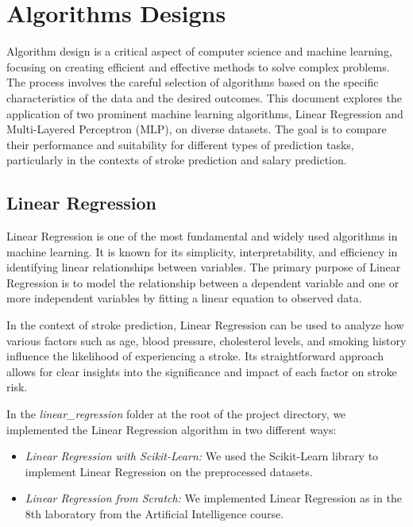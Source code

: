 \documentclass[runningheads]{paper}
\begin{document}
\section{Algorithms Designs}
Algorithm design is a critical aspect of computer science and machine learning, 
focusing on creating efficient and effective methods to solve complex problems. 
The process involves the careful selection of algorithms based on the specific 
characteristics of the data and the desired outcomes. This document explores the 
application of two prominent machine learning algorithms, Linear Regression and 
Multi-Layered Perceptron (MLP), on diverse datasets. The goal is to compare their 
performance and suitability for different types of prediction tasks, particularly 
in the contexts of stroke prediction and salary prediction.

\subsection{Linear Regression}
Linear Regression is one of the most fundamental and widely used algorithms in 
machine learning. It is known for its simplicity, interpretability, and 
efficiency in identifying linear relationships between variables. The primary 
purpose of Linear Regression is to model the relationship between a dependent 
variable and one or more independent variables by fitting a linear equation to 
observed data.

In the context of stroke prediction, Linear Regression can be used to analyze 
how various factors such as age, blood pressure, cholesterol levels, and smoking 
history influence the likelihood of experiencing a stroke. Its straightforward 
approach allows for clear insights into the significance and impact of each 
factor on stroke risk.

In the \textit{linear\_regression} folder at the root of the project directory,
we implemented the Linear Regression algorithm in two different ways:

\begin{itemize}
    \item \textit{Linear Regression with Scikit-Learn:} We used the Scikit-Learn
    library to implement Linear Regression on the preprocessed datasets.
    \item \textit{Linear Regression from Scratch:} We implemented Linear Regression
    as in the 8th laboratory from the Artificial Intelligence course.
\end{itemize}
\end{document}
